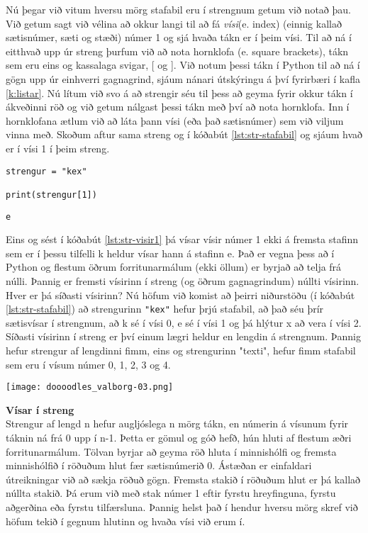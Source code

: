 Nú þegar við vitum hversu mörg stafabil eru í strengnum getum við notað þau.
Við getum sagt við vélina að okkur langi til að fá \emph{vísi}(e. index) (einnig kallað sætisnúmer, sæti og stæði) númer 1 og sjá hvaða tákn er í þeim vísi.
Til að ná í eitthvað upp úr streng þurfum við að nota hornklofa (e. square brackets), tákn sem eru eins og kassalaga svigar, [ og ].
Við notum þessi tákn í Python til að ná í gögn upp úr einhverri gagnagrind, sjáum nánari útskýringu á því fyrirbæri í kafla \ref{k:listar}.
Nú lítum við svo á að strengir séu til þess að geyma fyrir okkur tákn í ákveðinni röð og við getum nálgast þessi tákn með því að nota hornklofa.
Inn í hornklofana ætlum við að láta þann vísi (eða það sætisnúmer) sem við viljum vinna með.
Skoðum aftur sama streng og í kóðabút \ref{lst:str-stafabil} og sjáum hvað er í vísi 1 í þeim streng.
\begin{lstlisting}[caption=Vísir 1, label=lst:str-visir1]
strengur = "kex"

print(strengur[1])
\end{lstlisting}
\lstset{style=uttak}
\begin{lstlisting}
e
\end{lstlisting}
\lstset{style=venjulegt}

Eins og sést í kóðabút \ref{lst:str-visir1} þá vísar vísir númer 1 ekki á fremsta stafinn sem er í þessu tilfelli k heldur vísar hann á stafinn e.
Það er vegna þess að í Python og flestum öðrum forritunarmálum (ekki öllum) er byrjað að telja frá núlli.
Þannig er fremsti vísirinn í streng (og öðrum gagnagrindum) núllti vísirinn.
Hver er þá síðasti vísirinn?
Nú höfum við komist að þeirri niðurstöðu (í kóðabút \ref{lst:str-stafabil}) að strengurinn \texttt{"kex"} hefur þrjú stafabil, að það séu þrír sætisvísar í strengnum, að k sé í vísi 0, e sé í vísi 1 og þá hlýtur x að vera í vísi 2.
Síðasti vísirinn í streng er því einum lægri heldur en lengdin á strengnum.
Þannig hefur strengur af lengdinni fimm, eins og strengurinn "texti", hefur fimm stafabil sem eru í vísum númer 0, 1, 2, 3 og 4.
\vspace{1cm}
\begin{center}
	\texttt{[image: doooodles\_valborg-03.png]}
\end{center}
\newpage
\begin{itarefni}
\textbf{Vísar í streng}\\
Strengur af lengd n hefur augljóslega n mörg tákn, en númerin á vísunum fyrir táknin ná frá 0 upp í n-1.
Þetta er gömul og góð hefð, hún hluti af flestum æðri forritunarmálum.
Tölvan byrjar að geyma röð hluta í minnishólfi og fremsta minnishólfið í röðuðum hlut fær sætisnúmerið 0.
Ástæðan er einfaldari útreikningar við að sækja röðuð gögn.
Fremsta stakið í röðuðum hlut er þá kallað núllta stakið.
Þá erum við með stak númer 1 eftir fyrstu hreyfinguna, fyrstu aðgerðina eða fyrstu tilfærsluna.
Þannig helst það í hendur hversu mörg skref við höfum tekið í gegnum hlutinn og hvaða vísi við erum í.
\end{itarefni}

